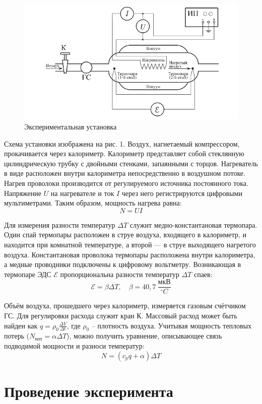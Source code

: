 \documentclass[14pt, a4paper]{report}
\newcommand{\EDS}{\ensuremath{\mathscr{E}}}
\begin{document}
\begin{figure}[!ht]
\centering
\includegraphics[scale=0.6]{terma8_01.png}
\caption{Экспериментальная установка}
\end{figure}

Схема установки изображена на рис. 1. Воздух, нагнетаемый компрессором, прокачивается через калориметр. Калориметр представляет собой стеклянную цилиндрическую трубку с двойными стенками, запаянными с торцов. Нагреватель в виде расположен внутри калориметра непосредственно в воздушном потоке. Нагрев проволоки производится от регулируемого источника постоянного тока. Напряжение $U$ на нагревателе и ток $I$ через него регистрируются цифровыми мультиметрами. Таким образом, мощность нагрева равна:
\[N=UI\]

Для измерения разности температур $\Delta T$ служит медно-константановая термопара. Один спай термопары расположен в струе воздуха, входящего в калориметр, и находится при комнатной температуре, а второй — в струе выходящего нагретого воздуха. Константановая проволока термопары расположена внутри калориметра, а медные проводники подключены к цифровому вольтметру. Возникающая в термопаре ЭДС $\EDS$ пропорциональна разности температур $\Delta T$ спаев: 
\[\EDS=\beta\Delta T,\quad\beta=40,7\ \frac{мкВ}{^\circ C}\]

Объём воздуха, прошедшего через калориметр, измеряется газовым счётчиком ГС. Для регулировки расхода служит кран К. Массовый расход может быть найден как $q=\rho_0\frac{\Delta V}{\Delta t}$, где $\rho_0$ -- плотность воздуха.
Учитывая мощность тепловых потерь ($N_{пот}=\alpha\Delta T$), можно получить уравнение, описывающее связь подводимой мощности и разноси температур:
\[N=(c_pq+\alpha)\Delta T\]

\section{Проведение эксперимента}
\end{document}

